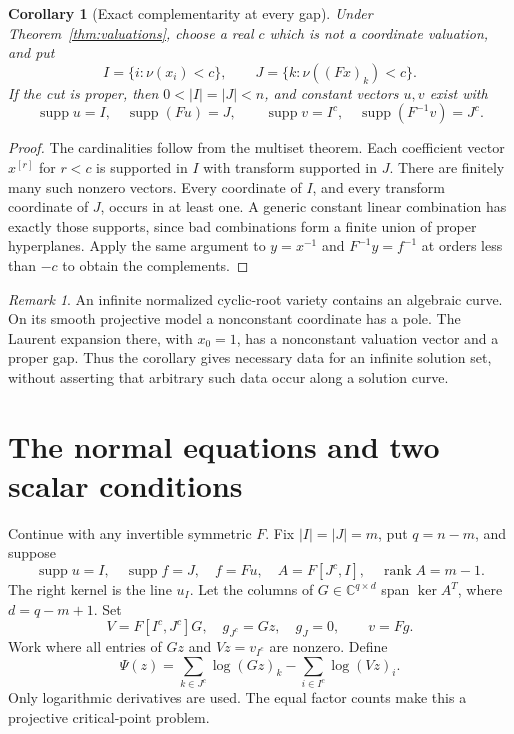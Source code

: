 \documentclass[11pt]{article}
\newtheorem{corollary}[theorem]{Corollary}
\theoremstyle{remark}\newtheorem{remark}[theorem]{Remark}
\DeclareMathOperator{\supp}{supp}
\DeclareMathOperator{\rank}{rank}
\newcommand{\C}{\mathbb C}\newcommand{\Q}{\mathbb Q}
\begin{document}
\begin{corollary}[Exact complementarity at every gap]\label{cor:gaps}
Under Theorem~\ref{thm:valuations}, choose a real $c$ which is not a
coordinate valuation, and put
\[
 I=\{i:\nu(x_i)<c\},\qquad J=\{k:\nu((Fx)_k)<c\}.
\]
If the cut is proper, then $0<|I|=|J|<n$, and constant vectors $u,v$ exist with
\[
 \supp u=I,\quad\supp(Fu)=J,\qquad
 \supp v=I^c,\quad\supp(F^{-1}v)=J^c.
\]
\end{corollary}
\begin{proof}
The cardinalities follow from the multiset theorem. Each coefficient vector
$x^{[r]}$ for $r<c$ is supported in $I$ with transform supported in $J$.
There are finitely many such nonzero vectors. Every coordinate of $I$,
and every transform coordinate of $J$, occurs in at least one.
A generic constant linear combination has exactly those supports,
since bad combinations form a finite union of proper hyperplanes.
Apply the same argument to $y=x^{-1}$ and $F^{-1}y=f^{-1}$ at orders
less than $-c$ to obtain the complements.
\end{proof}

\begin{remark}
An infinite normalized cyclic-root variety contains an algebraic curve.
On its smooth projective model a nonconstant coordinate has a pole.
The Laurent expansion there, with $x_0=1$, has a nonconstant valuation
vector and a proper gap. Thus the corollary gives necessary data for an
infinite solution set, without asserting that arbitrary such data occur
along a solution curve.
\end{remark}

\section{The normal equations and two scalar conditions}
Continue with any invertible symmetric $F$. Fix $|I|=|J|=m$, put $q=n-m$,
and suppose
\begin{equation}\label{eq:endpoint}
 \supp u=I,\quad\supp f=J,\quad f=Fu,\quad
 A=F[J^c,I],\quad\rank A=m-1.
\end{equation}
The right kernel is the line $u_I$. Let the columns of $G\in\C^{q\times d}$
span $\ker A^T$, where $d=q-m+1$. Set
\[
 V=F[I^c,J^c]G,\quad g_{J^c}=Gz,\quad g_J=0,\qquad v=Fg.
\]
Work where all entries of $Gz$ and $Vz=v_{I^c}$ are nonzero. Define
\begin{equation}\label{eq:psi}
 \Psi(z)=\sum_{k\in J^c}\log(Gz)_k-\sum_{i\in I^c}\log(Vz)_i.
\end{equation}
Only logarithmic derivatives are used. The equal factor counts make
this a projective critical-point problem.
\end{document}
